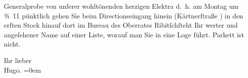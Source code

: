                Generalprobe von unſerer wohltönenden herzigen Elektra d. h. am Montag um ¾ 11{ }{\pb}pünktlich gehen Sie beim Directionseingang hinein (Kärtnerſtraße
               ) in den erſten Stock hinauf dort im Bureau des Oberrates Ribitſchſteht Ihr werter und angeſehener Name auf einer
               Liste, worauf man Sie in eine Loge führt. Parkett ist nicht.\pend
           
\pstart
           Ihr lieber{\\[\baselineskip]}\spacefill\mbox{Hugo.}\pend
           \leftskip=0em{}\endnumbering{}  \newcommand{\dateiname}{L01831}\newcommand{\titel}{Hugo von Hofmannsthal an Arthur Schnitzler, 19. 3. [1909]}\newcommand{\editorInnen}{Martin Anton Müller und Gerd-Hermann Susen}
